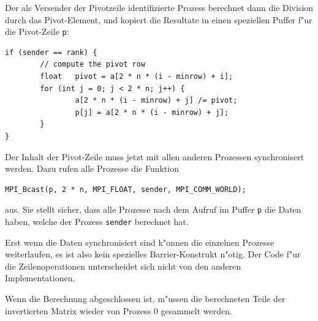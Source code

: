 Der als Versender der Pivotzeile identifizierte Prozess berechnet
dann die Division durch das Pivot-Element, und kopiert die Resultate
in einen speziellen Puffer f"ur die Pivot-Zeile \verb+p+:
\begin{verbatim}
if (sender == rank) {
        // compute the pivot row
        float   pivot = a[2 * n * (i - minrow) + i];
        for (int j = 0; j < 2 * n; j++) {
                a[2 * n * (i - minrow) + j] /= pivot;
                p[j] = a[2 * n * (i - minrow) + j];
        }
}
\end{verbatim}
Der Inhalt der Pivot-Zeile muss jetzt mit allen anderen Prozessen
synchronisert werden.
Dazu rufen alle Prozesse die Funktion
\begin{verbatim}
MPI_Bcast(p, 2 * n, MPI_FLOAT, sender, MPI_COMM_WORLD);
\end{verbatim}
aus. Sie stellt sicher, dass alle Prozesse nach dem Aufruf im Puffer \verb+p+
die Daten haben, welche der Prozess \verb+sender+ berechnet hat.

Erst wenn die Daten synchronisiert sind k"onnen die einzelnen Prozesse
weiterlaufen, es ist also kein spezielles Barrier-Konstrukt n"otig.
Der Code f"ur die Zeilenoperationen unterscheidet sich nicht von den
anderen Implementationen.

Wenn die Berechnung abgeschlossen ist, m"ussen die berechneten Teile
der invertierten Matrix wieder von Prozess 0 gesammelt werden.

